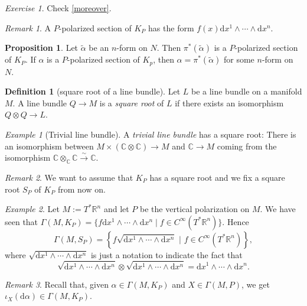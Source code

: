 \documentclass[12pt]{amsart}
\numberwithin{equation}{section}
\theoremstyle{plain}
\theoremstyle{definition}
\newtheorem{defn}{Definition}[subsection]
\newtheorem{prop}{Proposition}[subsection]
\theoremstyle{remark}
\newtheorem{rem}{Remark}[subsection]
\newtheorem{exe}{Exercise}[subsection]
\newtheorem{ex}{Example}[subsection]
\newcommand{\R}{\mathbb{R}}
\newcommand{\dd}{{\mathrm{d}}}
\begin{document}
\begin{exe}
Check \eqref{moreover}.
\end{exe}

\begin{rem}
A $P$-polarized section of $K_P$ has the form $f(x)\dd x^1\land\dotsm\land \dd x^n$.
\end{rem}

\begin{prop}
Let $\tilde{\alpha}$ be an $n$-form on $N$. Then $\pi^*(\tilde{\alpha})$ is a $P$-polarized section of $K_P$. If $\alpha$ is a $P$-polarized section of $K_p$, then $\alpha=\pi^*(\tilde{\alpha})$ for some $n$-form on $N$.
\end{prop}

\begin{defn}[square root of a line bundle]
Let $L$ be a line bundle on a manifold $M$. A line bundle $Q\to M$ is a \emph{square root} of $L$ if there exists an isomorphism $Q\otimes Q\to L$. 
\end{defn}

\begin{ex}[Trivial line bundle]
A \emph{trivial line bundle} has a square root: There is an isomorphism between $M\times (\mathbb{C}\otimes \mathbb{C})\to M$ and $\mathbb{C}\to M$ coming from the isomorphism $\mathbb{C}\otimes_\mathbb{C}\mathbb{C}\xrightarrow{\sim} \mathbb{C}$.
\end{ex}

\begin{rem}
We want to assume that $K_P$ has a square root and we fix a square root $S_P$ of $K_P$ from now on.
\end{rem}

\begin{ex}
Let $M:=T^*\R^n$ and let $P$ be the vertical polarization on $M$. We have seen that $\Gamma(M,K_P)=\{f\dd x^1\land\dotsm \land \dd x^n\mid f\in C^\infty(T^*\R^n)\}$. Hence 
$$\Gamma(M,S_P)=\left\{f\sqrt{\dd x^1\land\dotsm \land\dd x^n}\,\,\big|\,\, f\in C^\infty(T^*\R^n)\right\},$$
where $\sqrt{\dd x^1\land \dotsm \land \dd x^n}$ is just a notation to indicate the fact that 
$$\sqrt{\dd x^1\land \dotsm \land \dd x^n}\otimes\sqrt{\dd x^1\land \dotsm \land \dd x^n}=\dd x^1\land\dotsm \land\dd x^n.$$
\end{ex}

\begin{rem}
\label{rem_form}
Recall that, given $\alpha\in\Gamma(M,K_P)$ and $X\in\Gamma(M,P)$, we get $\iota_X(\dd\alpha)\in\Gamma(M,K_P)$.
\end{rem}
\end{document}
